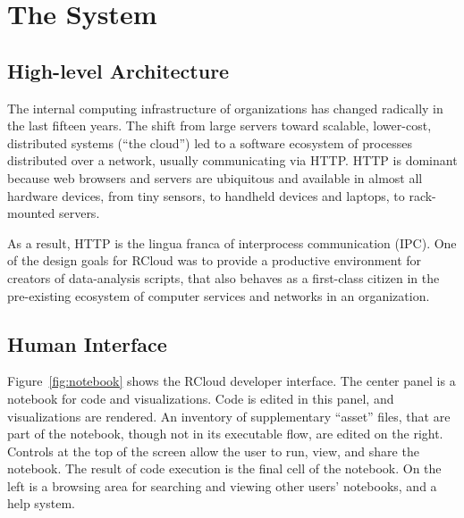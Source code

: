 \section{The System\label{sec:system}}

\subsection{High-level Architecture\label{sec:highlevelarchitecture}}


The internal computing infrastructure of organizations has changed
radically in the last fifteen years. The shift from large
servers toward scalable, lower-cost, distributed systems (``the cloud'')
led to a software ecosystem of processes distributed over a
network, usually communicating via HTTP. HTTP is dominant because
web browsers and servers are ubiquitous and available in almost
all hardware devices, from tiny sensors, to handheld devices and
laptops, to rack-mounted servers.

As a result, HTTP is the lingua franca of interprocess communication
(IPC). One of the design goals for RCloud was to provide a productive
environment for creators of data-analysis scripts, that also behaves
as a first-class citizen in the pre-existing ecosystem of computer
services and networks in an organization.


\subsection{Human Interface\label{sec:humaninterface}}


Figure~\ref{fig:notebook} shows the RCloud developer interface.  The center
panel is a notebook for code and visualizations.  Code is edited in this panel,
and visualizations are rendered.  An inventory of supplementary ``asset'' files,
that are part of the notebook, though not in its executable flow, are edited on
the right.  Controls at the top of the screen allow the user to run, view, and
share the notebook.  The result of code execution is the final cell of the notebook.  On the
left is a browsing area for searching and viewing other users' notebooks, and a
help system.

